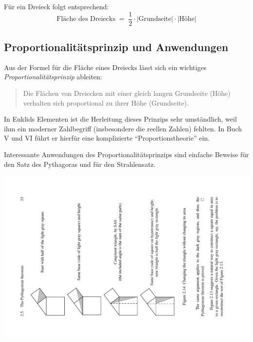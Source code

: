 


Für ein Dreieck folgt entsprechend:
$$
    \mbox{Fläche des Dreiecks} \; = \; \frac{1}{2} \cdot |\mbox{Grundseite}| \cdot |\mbox{Höhe}|
$$

\subsection*{Proportionalitätsprinzip und Anwendungen}

Aus der Formel für die Fläche eines Dreiecks lässt sich ein wichtiges {\em Proportionalitätsprinzip}
ableiten:


\begin{quote}
    Die Flächen von Dreiecken mit einer gleich langen Grundseite (Höhe) verhalten sich proportional
    zu ihrer Höhe (Grundseite).
\end{quote}

In Euklids Elementen ist die Herleitung dieses Prinzips sehr umständlich, weil ihm ein moderner
Zahlbegriff (insbesondere die reellen Zahlen) fehlten. In Buch V und VI führt er hierfür eine
komplizierte "`Proportionstheorie"' ein.

Interessante Anwendungen des Proportionalitätsprinzips sind einfache Beweise für den Satz des
Pythagoras und für den Strahlensatz. %


\centerline{\includegraphics[width=16cm]{BILDER/BildSatzDesPythagoras2.pdf}}

